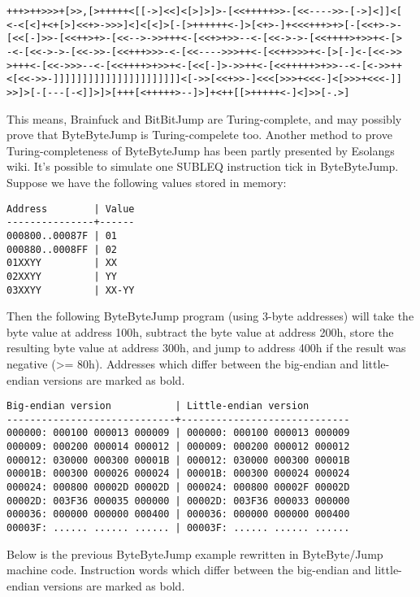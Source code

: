 \documentclass{article}
\begin{document}
\begin{verbatim}
+++>++>>>+[>>,[>+++++<[[->]<<]<[>]>]>-[<<+++++>>-[<<---->>-[->]<]]<[
<-<[<]+<+[>]<<+>->>>]<]<[<]>[-[>++++++<-]>[<+>-]+<<<+++>+>[-[<<+>->-
[<<[-]>>-[<<++>+>-[<<-->->>+++<-[<<+>+>>--<-[<<->->-[<<++++>+>>+<-[>
-<-[<<->->-[<<->>-[<<+++>>>-<-[<<---->>>++<-[<<++>>>+<-[>[-]<-[<<->>
>+++<-[<<->>>--<-[<<++++>+>>+<-[<<[-]>->>++<-[<<+++++>+>>--<-[<->>++
<[<<->>-]]]]]]]]]]]]]]]]]]]]]]<[->>[<<+>>-]<<<[>>>+<<<-]<[>>>+<<<-]]
>>]>[-[---[-<]]>]>[+++[<+++++>--]>]+<++[[>+++++<-]<]>>[-.>]
\end{verbatim}

\par This means, Brainfuck and BitBitJump are Turing-complete, and may possibly prove that ByteByteJump is Turing-compelete too. Another method to prove Turing-completeness of ByteByteJump has been partly presented by Esolangs wiki. It's possible to simulate one SUBLEQ instruction tick in ByteByteJump. Suppose we have the following values stored in memory:

\begin{verbatim}
Address        | Value
---------------+------
000800..00087F | 01
000880..0008FF | 02
01XXYY         | XX
02XXYY         | YY
03XXYY         | XX-YY
\end{verbatim}

\par Then the following ByteByteJump program (using 3-byte addresses) will take the byte value at address 100h, subtract the byte value at address 200h, store the resulting byte value at address 300h, and jump to address 400h if the result was negative (>= 80h). Addresses which differ between the big-endian and little-endian versions are marked as bold.

\begin{verbatim}
Big-endian version           | Little-endian version
-----------------------------+-----------------------------
000000: 000100 000013 000009 | 000000: 000100 000013 000009
000009: 000200 000014 000012 | 000009: 000200 000012 000012
000012: 030000 000300 00001B | 000012: 030000 000300 00001B
00001B: 000300 000026 000024 | 00001B: 000300 000024 000024
000024: 000800 00002D 00002D | 000024: 000800 00002F 00002D
00002D: 003F36 000035 000000 | 00002D: 003F36 000033 000000
000036: 000000 000000 000400 | 000036: 000000 000000 000400
00003F: ...... ...... ...... | 00003F: ...... ...... ......
\end{verbatim}

\par Below is the previous ByteByteJump example rewritten in ByteByte/Jump machine code. Instruction words which differ between the big-endian and little-endian versions are marked as bold.
\end{document}
